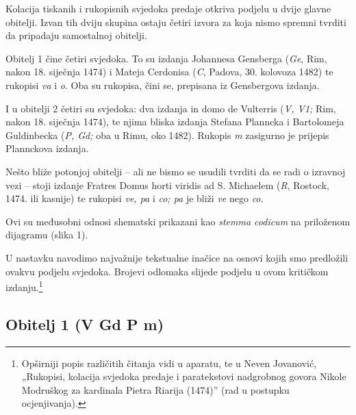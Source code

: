 \documentclass[a5paper,twoside]{article}
\begin{document}
Kolacija tiskanih i rukopisnih svjedoka predaje otkriva podjelu u dvije glavne obitelji. Izvan tih dviju skupina ostaju četiri izvora za koja nismo spremni tvrditi da pripadaju samostalnoj obitelji. 

Obitelj 1 čine četiri svjedoka. To su izdanja Johannesa Gensberga (\textit{Ge}, Rim, nakon 18. siječnja 1474) i Mateja Cerdonisa (\textit{C}, Padova, 30. kolovoza 1482) te rukopisi \textit{va} i \textit{o}. Oba su rukopisa, čini se, prepisana iz Gensbergova izdanja. 

I u obitelji 2 četiri su svjedoka: dva izdanja in domo de Vulterris (\textit{V, V1;} Rim, nakon 18. siječnja 1474), te njima bliska izdanja Stefana Planncka i Bartolomeja Guldinbecka (\textit{P, Gd;} oba u Rimu, oko 1482). Rukopis \textit{m} zasigurno je prijepis Plannckova izdanja. 

Nešto bliže potonjoj obitelji – ali ne bismo se usudili tvrditi da se radi o izravnoj vezi – stoji izdanje Fratres Domus horti viridis ad S. Michaelem (\textit{R}, Rostock, 1474. ili kasnije) te rukopisi \textit{ve, pa} i \textit{co; pa} je bliži \textit{ve} nego \textit{co.}

Ovi su međusobni odnosi shematski prikazani kao \textit{stemma codicum} na priloženom dijagramu (slika 1).

U nastavku navodimo najvažnije tekstualne inačice na osnovi kojih smo predložili ovakvu podjelu svjedoka. Brojevi odlomaka slijede podjelu u ovom kritičkom izdanju.\footnote{Opširniji popis različitih čitanja vidi u aparatu, te u Neven Jovanović, „Rukopisi, kolacija svjedoka predaje i paratekstovi nadgrobnog govora Nikole Modruškog za kardinala Pietra Riarija (1474)” (rad u postupku ocjenjivanja).}

\subsection{Obitelj 1 (V Gd P m)}
\end{document}
